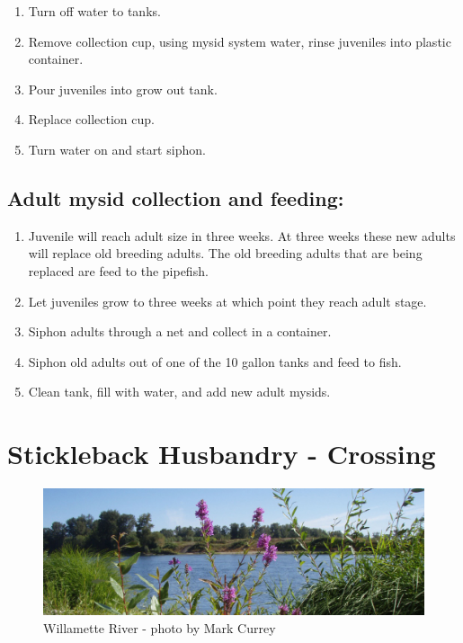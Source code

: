 \documentclass[
]{book}
\begin{document}
\begin{enumerate}
\def\labelenumi{\arabic{enumi}.}
\item
  Turn off water to tanks.
\item
  Remove collection cup, using mysid system water, rinse juveniles into plastic container.
\item
  Pour juveniles into grow out tank.
\item
  Replace collection cup.
\item
  Turn water on and start siphon.
\end{enumerate}

\hypertarget{adult-mysid-collection-and-feeding}{%
\section{Adult mysid collection and feeding:}\label{adult-mysid-collection-and-feeding}}

\begin{enumerate}
\def\labelenumi{\arabic{enumi}.}
\item
  Juvenile will reach adult size in three weeks. At three weeks these new adults will replace old breeding adults. The old breeding adults that are being replaced are feed to the pipefish.
\item
  Let juveniles grow to three weeks at which point they reach adult stage.
\item
  Siphon adults through a net and collect in a container.
\item
  Siphon old adults out of one of the 10 gallon tanks and feed to fish.
\item
  Clean tank, fill with water, and add new adult mysids.
\end{enumerate}

\hypertarget{stickleback-husbandry---crossing}{%
\chapter{Stickleback Husbandry - Crossing}\label{stickleback-husbandry---crossing}}

\begin{figure}
\centering
\includegraphics{images/willamette_header.jpg}
\caption{Willamette River - photo by Mark Currey}
\end{figure}
\end{document}
